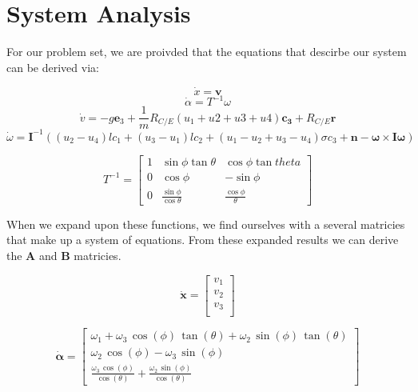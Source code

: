 \documentclass{article}
\begin{document}
\section*{System Analysis}

For our problem set, we are proivded that the equations that descirbe our system can be derived via:

\begin{equation}
    \dot{x} = \boldsymbol{v}
\end{equation}
\begin{equation}
    \dot{\alpha} = T^{-1}\omega
\end{equation}
\begin{equation}
    \dot{v} = -g \boldsymbol{e}_3 + \frac{1}{m}R_{C/E}(u_1+u2+u3+u4)\boldsymbol{c_3}+R_{C/E}\boldsymbol{r}
\end{equation}
\begin{equation}
    \dot{\omega} = \boldsymbol{I}^{-1} ((u_2 - u_4) l c_1 + (u_3-u_1) l c_2 + (u_1 - u_2 + u_3 -u_4) \sigma c_3 + \boldsymbol{n} - \boldsymbol{\omega} \times \boldsymbol{I} \boldsymbol{\omega})
\end{equation}

\begin{equation}
    T^{-1} = \begin{bmatrix}
        1 & \sin{\phi} \tan{\theta} & \cos{\phi}\tan{theta} \\
        0 & \cos{\phi} & -\sin{\phi} \\
        0 & \frac{\sin{\phi}}{\cos{\theta}} & \frac{\cos{\phi}}{\theta}
    \end{bmatrix}
\end{equation}


When we expand upon these functions, we find ourselves with a several matricies that make up a system of equations. From these expanded results we can derive the $\boldsymbol{A}$ and $\boldsymbol{B}$ matricies.

\begin{equation}
    \dot{\boldsymbol{x}} =
    \begin{bmatrix}
        v_1 \\
        v_2 \\
        v_3 \\
    \end{bmatrix}
\end{equation}

\begin{equation}
    \dot{\boldsymbol{\alpha}} =
    \begin{bmatrix}
        \omega_1 +\omega_3 \,\cos \left(\phi \right)\,\tan \left(\theta \right)+\omega_2 \,\sin \left(\phi \right)\,\tan \left(\theta \right)\\
        \omega_2 \,\cos \left(\phi \right)-\omega_3 \,\sin \left(\phi \right)\\
        \frac{\omega_3 \,\cos \left(\phi \right)}{\cos \left(\theta \right)}+\frac{\omega_2 \,\sin \left(\phi \right)}{\cos \left(\theta \right)}
    \end{bmatrix}
\end{equation}
\end{document}
